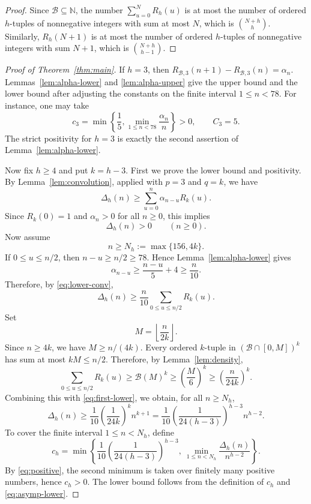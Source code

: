 \documentclass[10pt,a4paper]{amsart}
\newcommand{\BaseB}{\mathcal B}
\begin{document}
\begin{proof}
Since $\BaseB\subseteq \mathbb N$, the number $\sum_{u=0}^N R_h(u)$ is at most the number of ordered $h$-tuples of nonnegative integers with sum at most $N$, which is $\binom{N+h}{h}$. Similarly, $R_h(N+1)$ is at most the number of ordered $h$-tuples of nonnegative integers with sum $N+1$, which is $\binom{N+h}{h-1}$.
\end{proof}


\begin{proof}[Proof of Theorem~\ref{thm:main}]
If $h=3$, then \(R_{\BaseB,3}(n+1)-R_{\BaseB,3}(n)=\alpha_n\). Lemmas~\ref{lem:alpha-lower} and \ref{lem:alpha-upper} give the upper bound and the lower bound after adjusting the constants on the finite interval $1\le n<78$. For instance, one may take
\[
c_3=\min\left\{\frac15,\min_{1\le n<78}\frac{\alpha_n}{n}\right\}>0,
\qquad C_3=5.
\]
The strict positivity for $h=3$ is exactly the second assertion of Lemma~\ref{lem:alpha-lower}.

Now fix $h\ge 4$ and put $k=h-3$.
First we prove the lower bound and positivity. By Lemma~\ref{lem:convolution}, applied with $p=3$ and $q=k$, we have
\begin{equation}\label{eq:lower-conv}
\Delta_h(n)\ge \sum_{u=0}^n \alpha_{n-u}R_k(u).
\end{equation}
Since $R_k(0)=1$ and $\alpha_n>0$ for all $n\ge 0$, this implies
\begin{equation}\label{eq:positive}
\Delta_h(n)>0\qquad (n\ge 0).
\end{equation}
Now assume
\[
n\ge N_h:=\max\{156,4k\}.
\]
If $0\le u\le n/2$, then $n-u\ge n/2\ge 78$. Hence Lemma~\ref{lem:alpha-lower} gives
\[
\alpha_{n-u}\ge \frac{n-u}{5}+4\ge \frac n{10}.
\]
Therefore, by \eqref{eq:lower-conv},
\begin{equation}\label{eq:first-lower}
\Delta_h(n)\ge \frac n{10}\sum_{0\le u\le n/2}R_k(u).
\end{equation}
Set
\[
M=\left\lfloor\frac n{2k}\right\rfloor.
\]
Since $n\ge 4k$, we have $M\ge n/(4k)$. Every ordered $k$-tuple in $(\BaseB\cap[0,M])^k$ has sum at most $kM\le n/2$. Therefore, by Lemma~\ref{lem:density},
\[
\sum_{0\le u\le n/2}R_k(u)\ge  \BaseB (M)^k\ge \left(\frac M6\right)^k\ge \left(\frac n{24k}\right)^k.
\]
Combining this with \eqref{eq:first-lower}, we obtain, for all $n\ge N_h$,
\begin{equation}\label{eq:asymp-lower}
\Delta_h(n)\ge \frac1{10}\left(\frac1{24k}\right)^k n^{k+1}=\frac1{10}\left(\frac1{24(h-3)}\right)^{h-3}n^{h-2}.
\end{equation}
To cover the finite interval $1\le n<N_h$, define
\[
c_h=\min\left\{\frac1{10}\left(\frac1{24(h-3)}\right)^{h-3},\ \min_{1\le n<N_h}\frac{\Delta_h(n)}{n^{h-2}}\right\}.
\]
By \eqref{eq:positive}, the second minimum is taken over finitely many positive numbers, hence $c_h>0$. The lower bound follows from the definition of $c_h$ and \eqref{eq:asymp-lower}.


\end{proof}
\end{document}
